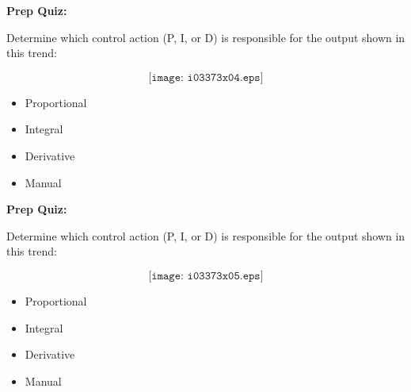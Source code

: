 \vfil \eject

\noindent
{\bf Prep Quiz:}

Determine which control action (P, I, or D) is responsible for the output shown in this trend:

$$\texttt{[image: i03373x04.eps]}$$

\begin{itemize}
\item{} Proportional
\vskip 10pt
\item{} Integral
\vskip 10pt
\item{} Derivative
\vskip 10pt
\item{} Manual
\end{itemize}




\vfil \eject

\noindent
{\bf Prep Quiz:}

Determine which control action (P, I, or D) is responsible for the output shown in this trend:

$$\texttt{[image: i03373x05.eps]}$$

\begin{itemize}
\item{} Proportional
\vskip 10pt
\item{} Integral
\vskip 10pt
\item{} Derivative
\vskip 10pt
\item{} Manual
\end{itemize}





